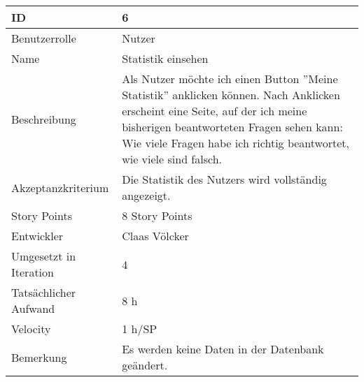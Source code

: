 \begin{tabularx}{\textwidth}{|p{}|X|}
	\hline
	ID & 6\\
	\hline
	Benutzerrolle & Nutzer\\
	\hline
	Name & Statistik einsehen\\
	\hline
	Beschreibung & Als Nutzer möchte ich einen Button ''Meine Statistik'' anklicken können. Nach Anklicken erscheint eine Seite, auf der ich meine bisherigen beantworteten Fragen sehen kann: Wie viele Fragen habe ich richtig beantwortet, wie viele sind falsch.\\
	\hline
	Akzeptanzkriterium & Die Statistik des Nutzers wird vollständig angezeigt.\\
	\hline
	Story Points & 8 Story Points\\
	\hline
	Entwickler & Claas Völcker\\
	\hline
	Umgesetzt in Iteration & 4\\
	\hline
	Tatsächlicher Aufwand & 8 h\\
	\hline
	Velocity & 1 h/SP\\
	\hline
	Bemerkung &  Es werden keine Daten in der Datenbank geändert.\\
	\hline
\end{tabularx}
\vspace{20pt}
